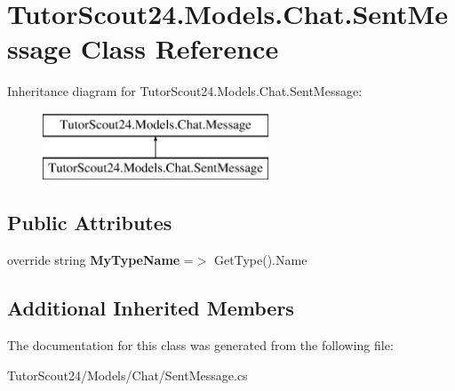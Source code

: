 \hypertarget{class_tutor_scout24_1_1_models_1_1_chat_1_1_sent_message}{}\section{Tutor\+Scout24.\+Models.\+Chat.\+Sent\+Message Class Reference}
\label{class_tutor_scout24_1_1_models_1_1_chat_1_1_sent_message}
Inheritance diagram for Tutor\+Scout24.\+Models.\+Chat.\+Sent\+Message\+:\begin{figure}[H]
\begin{center}
\leavevmode
\includegraphics[height=2.000000cm]{class_tutor_scout24_1_1_models_1_1_chat_1_1_sent_message}
\end{center}
\end{figure}
\subsection*{Public Attributes}
\begin{DoxyCompactItemize}
\item 
\mbox{\label{class_tutor_scout24_1_1_models_1_1_chat_1_1_sent_message_ab404c6ce730aeb373001df643e3bf093}} 
override string {\bfseries My\+Type\+Name} =$>$ Get\+Type().Name
\end{DoxyCompactItemize}
\subsection*{Additional Inherited Members}


The documentation for this class was generated from the following file\+:\begin{DoxyCompactItemize}
\item 
Tutor\+Scout24/\+Models/\+Chat/Sent\+Message.\+cs\end{DoxyCompactItemize}
